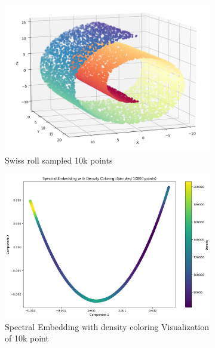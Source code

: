 \begin{itemize}
\begin{itemize}
                \begin{figure}[H]
                    \centering
                    \begin{subfigure}{0.45\textwidth}
                        \includegraphics[width=\linewidth]{images/sklearn (2).png}
                        \caption{Swiss roll sampled 10k points}
                        \label{fig:sklearn_SwissRoll_10k}
                    \end{subfigure}         
                    \begin{subfigure}{0.45\textwidth}
                        \includegraphics[width=\linewidth]{images/sklearn (4).png}
                        \caption{Spectral Embedding with density coloring Visualization of 10k point}
                        \label{fig:sklearn_SwissRoll_10k_R2}
                    \end{subfigure}
                    \caption{}
                    \label{fig:data_dol1}    	      	
                \end{figure}


\end{itemize}
\end{itemize}
